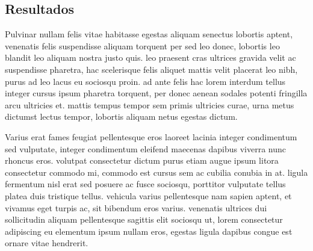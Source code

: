 \subsection{Resultados}

Pulvinar nullam felis vitae habitasse egestas aliquam senectus lobortis aptent, venenatis felis suspendisse aliquam torquent per sed leo donec, lobortis leo blandit leo aliquam nostra justo quis. leo praesent cras ultrices gravida velit ac suspendisse pharetra, hac scelerisque felis aliquet mattis velit placerat leo nibh, purus ad leo lacus eu sociosqu proin. ad ante felis hac lorem interdum tellus integer cursus ipsum pharetra torquent, per donec aenean sodales potenti fringilla arcu ultricies et. mattis tempus tempor sem primis ultricies curae, urna metus dictumst lectus tempor, lobortis aliquam netus egestas dictum.

Varius erat fames feugiat pellentesque eros laoreet lacinia integer condimentum sed vulputate, integer condimentum eleifend maecenas dapibus viverra nunc rhoncus eros. volutpat consectetur dictum purus etiam augue ipsum litora consectetur commodo mi, commodo est cursus sem ac cubilia conubia in at. ligula fermentum nisl erat sed posuere ac fusce sociosqu, porttitor vulputate tellus platea duis tristique tellus. vehicula varius pellentesque nam sapien aptent, et vivamus eget turpis ac, sit bibendum eros varius. venenatis ultrices dui sollicitudin aliquam pellentesque sagittis elit sociosqu ut, lorem consectetur adipiscing eu elementum ipsum nullam eros, egestas ligula dapibus congue est ornare vitae hendrerit.